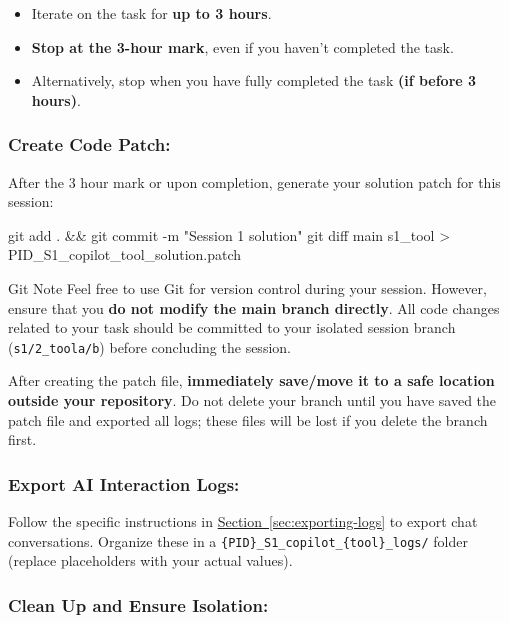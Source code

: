 \documentclass[11pt, a4paper]{article}
\begin{document}
    \begin{itemize}
        \item Iterate on the task for \textbf{up to 3 hours}.
        \item \textbf{Stop at the 3-hour mark}, even if you haven't completed the task.
        \item Alternatively, stop when you have fully completed the task \textbf{(if before 3 hours)}.
    \end{itemize}

\newpage

\subsubsection*{Create Code Patch:}
\label{sec:creating-patch}

    After the 3 hour mark or upon completion, generate your solution patch for this session:
    \begin{codebox}
git add . && git commit -m "Session 1 solution"     
git diff main s1_{tool} > {PID}_S1_copilot_{tool}_solution.patch
    \end{codebox}
    \begin{mainbox}{Git Note}
Feel free to use Git for version control during your session. However, ensure that you \textbf{do not modify the main branch directly}. All code changes related to your task should be committed to your isolated session branch (\texttt{s1/2\_toola/b}) before concluding the session.\newline

\noindent After creating the patch file, \textbf{immediately save/move it to a safe location outside your repository}. Do not delete your branch until you have saved the patch file and exported all logs; these files will be lost if you delete the branch first.
    \end{mainbox}

\subsubsection*{Export AI Interaction Logs:}

Follow the specific instructions in \hyperref[sec:exporting-logs]{Section~\ref*{sec:exporting-logs}} to export chat conversations. Organize these in a \verb|{PID}_S1_copilot_{tool}_logs/| folder (replace placeholders with your actual values).

\subsubsection*{Clean Up and Ensure Isolation:}
    
\end{document}
